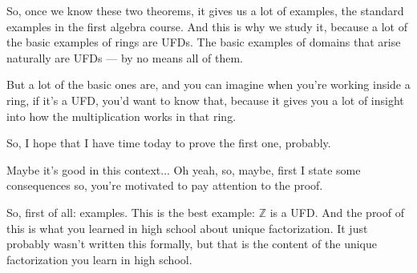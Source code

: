 \begin{speech}[00:17:25 - 00:18:35]
So, once we know these two theorems,  it gives us a lot of examples, the standard examples in the first algebra course. And this is why we study it, because a lot of the basic examples of rings are UFDs. The basic examples of domains that arise naturally are UFDs --- by no means all of them.

But a lot of the basic ones are, and you can imagine when you're working inside a ring, if it's a UFD, you'd want to know that, because it gives you a lot of insight into how the multiplication works in that ring. 

So, I hope that I have time today to prove the first one, probably.

Maybe it's good in this context... Oh yeah, so, maybe, first I state some consequences so, you're motivated to pay attention to the proof.

So, first of all: examples.  This is the best example: $\mathbb{Z}$ is a UFD.  And the proof of this is what you learned in high school about unique factorization. It just probably wasn't written this formally, but that is the content of the unique factorization you learn in high school.
\end{speech}

\begin{hidden}
\end{hidden}

\begin{content}
\end{content}

